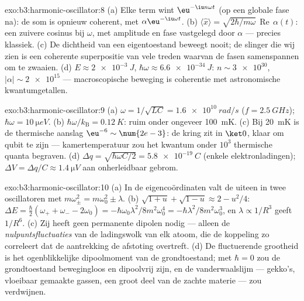 \begin{solution}{exo:b3:harmonic-oscillator:8}
(a) Elke term wint $\eu^{-\iu n\omega t}$ (op een globale fase na): de
som is opnieuw coherent, met $\alpha\eu^{-\iu\omega t}$. (b)
$\langle\hat x\rangle = \sqrt{2\hbar/m\omega}\,
\operatorname{Re}\,\alpha(t)$: een zuivere cosinus bij $\omega$, met
amplitude en fase vastgelegd door $\alpha$ --- precies klassiek. (c) De
dichtheid van een eigentoestand beweegt nooit; de slinger die wij zien is
een coherente superpositie van vele treden waarvan de fasen samenspannen
om te zwaaien. (d) $E
\approx \qty{2e-3}{J}$, $\hbar\omega \approx \qty{6.6e-34}{J}$: $n
\sim \num{3e30}$, $|\alpha| \sim \num{2e15}$ ---
macroscopische beweging is coherentie met astronomische kwantumgetallen.
\end{solution}

\begin{solution}{exo:b3:harmonic-oscillator:9}
(a) $\omega = 1/\sqrt{LC} = \qty{1.6e10}{rad/s}$ ($f =
\qty{2.5}{GHz}$); $\hbar\omega = \qty{10}{\micro eV}$. (b)
$\hbar\omega/k_{\text{B}} = \qty{0.12}{K}$: ruim onder ongeveer
\qty{100}{mK}. (c) Bij \qty{20}{mK} is de thermische aanslag
$\eu^{-6} \sim \num{2e-3}$: de kring zit in $\ket0$, klaar om qubit te
zijn --- kamertemperatuur zou het kwantum onder $10^3$ thermische quanta
begraven. (d) $\Delta q = \sqrt{\hbar\omega C/2} =
\qty{5.8e-19}{C}$ (enkele elektronladingen); $\Delta V = \Delta q/C
\approx \qty{1.4}{\micro V}$ aan onherleidbaar gebrom.
\end{solution}

\begin{solution}{exo:b3:harmonic-oscillator:10}
(a) In de eigencoördinaten valt de  uiteen in twee
oscillatoren met $m\omega_\pm^2 = m\omega_0^2 \pm \lambda$. (b)
$\sqrt{1 + u} + \sqrt{1 - u} \approx 2 - u^2/4$: $\Delta E =
\tfrac\hbar2(\omega_+ + \omega_- - 2\omega_0) =
-\hbar\omega_0\lambda^2/8m^2\omega_0^4 =
-\hbar\lambda^2/8m^2\omega_0^3$, en $\lambda \propto 1/R^3$ geeft
$1/R^6$. (c) Zij heeft geen permanente dipolen nodig --- alleen de
\emph{nulpuntsfluctuaties} van de ladingswolk van elk atoom, die de
koppeling zo correleert dat de aantrekking de afstoting overtreft. (d) De
fluctuerende grootheid is het ogenblikkelijke dipoolmoment van de
grondtoestand; met $\hbar = 0$ zou de grondtoestand bewegingloos en
dipoolvrij zijn, en de vanderwaalslijm --- gekko's, vloeibaar gemaakte
gassen, een groot deel van de zachte materie --- zou verdwijnen.
\end{solution}

